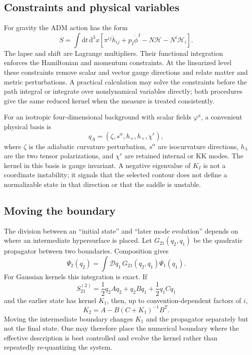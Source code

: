 \documentclass[aps,prd,twocolumn,superscriptaddress,nofootinbib,longbibliography,floatfix]{revtex4-2}
\newcommand{\dd}{\mathrm d}
\begin{document}
\subsection{Constraints and physical variables}
For gravity the ADM action has the form
\begin{equation}
S=\int\dd t\,\dd^3x\left[\pi^{ij}\dot h_{ij}+p_I\dot\phi^I-N\mathcal H-N^i\mathcal H_i\right].
\end{equation}
The lapse and shift are Lagrange multipliers. Their functional integration enforces the Hamiltonian and momentum constraints. At the linearized level these constraints remove scalar and vector gauge directions and relate matter and metric perturbations. A practical calculation may solve the constraints before the path integral or integrate over nondynamical variables directly; both procedures give the same reduced kernel when the measure is treated consistently.

For an isotropic four-dimensional background with scalar fields $\varphi^a$, a convenient physical basis is
\begin{equation}
q_A=(\zeta,s^\alpha,h_+,h_\times,\chi^r),
\end{equation}
where $\zeta$ is the adiabatic curvature perturbation, $s^\alpha$ are isocurvature directions, $h_\lambda$ are the two tensor polarizations, and $\chi^r$ are retained internal or KK modes. The kernel in this basis is gauge invariant. A negative eigenvalue of $K_I$ is not a coordinate instability; it signals that the selected contour does not define a normalizable state in that direction or that the saddle is unstable.

\subsection{Moving the boundary}
The division between an ``initial state'' and ``later mode evolution'' depends on where an intermediate hypersurface is placed. Let $G_{21}(q_2,q_1)$ be the quadratic propagator between two boundaries. Composition gives
\begin{equation}
\Psi_2(q_2)=\int\mathcal Dq_1\,G_{21}(q_2,q_1)\Psi_1(q_1).
\end{equation}
For Gaussian kernels this integration is exact. If
\begin{equation}
S_{21}^{(2)}=\frac12q_2Aq_2+q_2Bq_1+\frac12q_1Cq_1
\end{equation}
and the earlier state has kernel $K_1$, then, up to convention-dependent factors of $i$,
\begin{equation}
K_2=A-B(C+K_1)^{-1}B^T.
\label{eq:compose}
\end{equation}
Moving the intermediate boundary changes $K_1$ and the propagator separately but not the final state. One may therefore place the numerical boundary where the effective description is best controlled and evolve the kernel rather than repeatedly re-quantizing the system.
\end{document}
